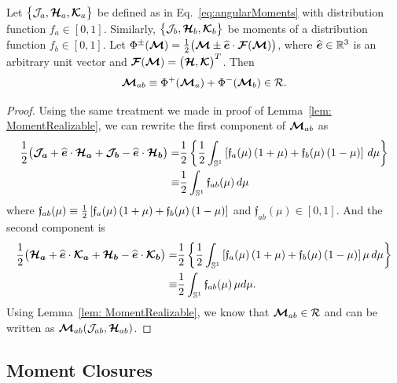 \begin{lemma}
  Let $\big\{\mathcal{J}_{a},\boldsymbol{\mathcal{H}}_{a},\boldsymbol{\mathcal{K}}_{a}\big\}$ be defined as in Eq.~\eqref{eq:angularMoments} with distribution function $f_{a}\in[0,1]$.  
  Similarly, $\big\{\mathcal{J}_{b},\boldsymbol{\mathcal{H}}_{b},\boldsymbol{\mathcal{K}}_{b}\big\}$ be moments of a distribution function $f_{b}\in[0,1]$.  
  Let $\Phi^{\pm}(\boldsymbol{\mathcal{M}})=\frac{1}{2}\big(\boldsymbol{\mathcal{M}}\pm\widehat{\boldsymbol{e}}\cdot\boldsymbol{\mathcal{F}}(\boldsymbol{\mathcal{M}})\big)$, where $\widehat{\boldsymbol{e}}\in\mathbb{R}^{3}$ is an arbitrary unit vector and $\boldsymbol{\mathcal{F}}(\boldsymbol{\mathcal{M}})=\big(\boldsymbol{\mathcal{H}},\boldsymbol{\mathcal{K}}\big)^{T}$.  
  Then
  \begin{equation}
    \boldsymbol{\mathcal{M}}_{ab} \equiv \Phi^{+}(\boldsymbol{\mathcal{M}}_{a})+\Phi^{-}(\boldsymbol{\mathcal{M}}_{b})\in\mathcal{R}.
  \end{equation}
\end{lemma}
\begin{proof}
  Using the same treatment we made in proof of Lemma~\ref{lem: MomentRealizable}, we can rewrite the first component of $\boldsymbol{\mathcal{M}}_{ab}$ as
  \begin{align*}
  \frac{1}{2}\big(\boldsymbol{\mathcal{J}_{a}} + \widehat{\boldsymbol{e}}\cdot\boldsymbol{\mathcal{H}_{a}}+\boldsymbol{\mathcal{J}_{b}} - \widehat{\boldsymbol{e}}\cdot\boldsymbol{\mathcal{H}_{b}}\big) = &\frac{1}{2} \left\lbrace \frac{1}{2}\int_{\mathbb{S}^{1}}\left[ \mathfrak{f}_{a}(\mu)\,(1+\mu) + \mathfrak{f}_{b}(\mu)\,(1-\mu)\right] \,d\mu \right\rbrace \\
  \equiv  &\frac{1}{2}\int_{\mathbb{S}^{1}} \mathfrak{f}_{ab}(\mu)\,d\mu
  \end{align*}
  where $\mathfrak{f}_{ab}(\mu) \equiv \frac{1}{2}\left[ \mathfrak{f}_{a}(\mu)\,(1+\mu) + \mathfrak{f}_{b}(\mu)\,(1-\mu)\right]$ and $\mathfrak{f}_{ab}(\mu)\in[0,1]$.
  And the second component is
  \begin{align*} 
   \frac{1}{2}\big(\boldsymbol{\mathcal{H}_{a}} + \widehat{\boldsymbol{e}}\cdot\boldsymbol{\mathcal{K}_{a}}+\boldsymbol{\mathcal{H}_{b}} - \widehat{\boldsymbol{e}}\cdot\boldsymbol{\mathcal{K}_{b}}\big) =
   &\frac{1}{2} \left\lbrace \frac{1}{2}\int_{\mathbb{S}^{1}}\left[ \mathfrak{f}_{a}(\mu)\,(1+\mu) + \mathfrak{f}_{b}(\mu)\,(1-\mu)\right]\mu \,d\mu \right\rbrace \\
   \equiv  &\frac{1}{2}\int_{\mathbb{S}^{1}} \mathfrak{f}_{ab}(\mu)\,\mu d\mu. 
  \end{align*}
  Using Lemma~\ref{lem: MomentRealizable}, we know that $\boldsymbol{\mathcal{M}}_{ab}\in\mathcal{R}$ and can be written as $\boldsymbol{\mathcal{M}}_{ab}(\mathcal{J}_{ab},\boldsymbol{\mathcal{H}}_{ab})$.
\end{proof}

\subsection{Moment Closures}

